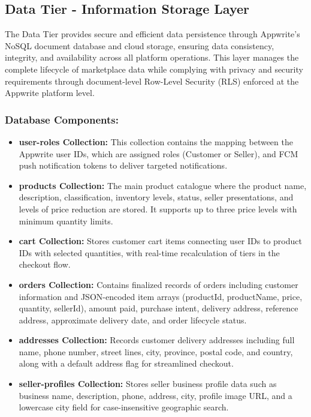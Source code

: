 \subsection{Data Tier - Information Storage Layer}
The Data Tier provides secure and efficient data persistence through Appwrite's NoSQL document database and cloud storage, ensuring data consistency, integrity, and availability across all platform operations. This layer manages the complete lifecycle of marketplace data while complying with privacy and security requirements through document-level Row-Level Security (RLS) enforced at the Appwrite platform level.

\subsubsection{Database Components:}
\begin{itemize}
    \item \textbf{user-roles Collection:} This collection contains the mapping between the Appwrite user IDs, which are assigned roles (Customer or Seller), and FCM push notification tokens to deliver targeted notifications.
    \item \textbf{products Collection:} The main product catalogue where the product name, description, classification, inventory levels, status, seller presentations, and levels of price reduction are stored. It supports up to three price levels with minimum quantity limits.
    \item \textbf{cart Collection:} Stores customer cart items connecting user IDs to product IDs with selected quantities, with real-time recalculation of tiers in the checkout flow.
    \item \textbf{orders Collection:} Contains finalized records of orders including customer information and JSON-encoded item arrays (productId, productName, price, quantity, sellerId), amount paid, purchase intent, delivery address, reference address, approximate delivery date, and order lifecycle status.
    \item \textbf{addresses Collection:} Records customer delivery addresses including full name, phone number, street lines, city, province, postal code, and country, along with a default address flag for streamlined checkout.
    \item \textbf{seller-profiles Collection:} Stores seller business profile data such as business name, description, phone, address, city, profile image URL, and a lowercase city field for case-insensitive geographic search.

\end{itemize}

